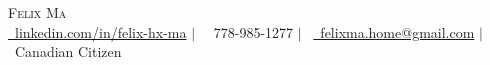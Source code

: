 \documentclass[letterpaper,11pt]{article}
\newcommand{\resumeItem}[1]{
  \item\small{
    {#1 \vspace{-2pt}}
  }
}
\newcommand{\resumeSubHeadingListStart}{\begin{itemize}[leftmargin=0.0in, label={}]}
\newcommand{\resumeItemListStart}{\begin{itemize}}
\begin{document}



\begin{center}
    {\Huge \scshape Felix Ma} \\ \vspace{1pt}
    \href{https://www.linkedin.com/in/felix-hx-ma/}{\raisebox{-0.2\height}\faLinkedin\ linkedin.com/in/felix-hx-ma} $\mid$~
    \small \raisebox{-0.1\height}\faPhone\ 778-985-1277 $\mid$~ \href{mailto:felixma.home@gmail.com}{\raisebox{-0.2\height}\faEnvelope\ felixma.home@gmail.com} $\mid$~ \raisebox{-0.1\height}\faPassport\ Canadian Citizen
    \vspace{-8pt}
\end{center}

\end{document}
